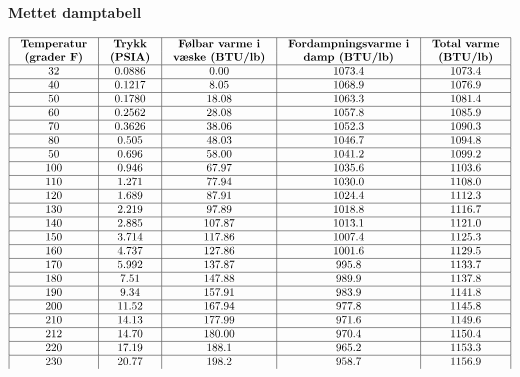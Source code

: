 


\centerline{\bf Mettet damptabell}

$$\vbox{\offinterlineskip
\halign{\strut
\vrule \quad\hfil # \ \hfil & 
\vrule \quad\hfil # \ \hfil & 
\vrule \quad\hfil # \ \hfil & 
\vrule \quad\hfil # \ \hfil & 
\vrule \quad\hfil # \ \hfil \vrule \cr
\noalign{\hrule}
%
{\bf Temperatur} & {\bf Trykk} & {\bf Følbar varme i} & {\bf Fordampningsvarme i} & {\bf Total varme} \cr
{\bf (grader F)} & {\bf (PSIA)} & {\bf væske (BTU/lb)} & {\bf damp (BTU/lb)} & {\bf (BTU/lb)} \cr
%
\noalign{\hrule}
%
32 & 0.0886 & 0.00 & 1073.4 & 1073.4 \cr
%
\noalign{\hrule}
%
40 & 0.1217 & 8.05 & 1068.9 & 1076.9 \cr
%
\noalign{\hrule}
%
50 & 0.1780 & 18.08 & 1063.3 & 1081.4 \cr
%
\noalign{\hrule}
%
60 & 0.2562 & 28.08 & 1057.8 & 1085.9 \cr
%
\noalign{\hrule}
%
70 & 0.3626 & 38.06 & 1052.3 & 1090.3 \cr
%
\noalign{\hrule}
%
80 & 0.505 & 48.03 & 1046.7 & 1094.8 \cr
%
\noalign{\hrule}
%
50 & 0.696 & 58.00 & 1041.2 & 1099.2 \cr
%
\noalign{\hrule}
%
100 & 0.946 & 67.97 & 1035.6 & 1103.6 \cr
%
\noalign{\hrule}
%
110 & 1.271 & 77.94 & 1030.0 & 1108.0 \cr
%
\noalign{\hrule}
%
120 & 1.689 & 87.91 & 1024.4 & 1112.3 \cr
%
\noalign{\hrule}
%
130 & 2.219 & 97.89 & 1018.8 & 1116.7 \cr
%
\noalign{\hrule}
%
140 & 2.885 & 107.87 & 1013.1 & 1121.0 \cr
%
\noalign{\hrule}
%
150 & 3.714 & 117.86 & 1007.4 & 1125.3 \cr
%
\noalign{\hrule}
%
160 & 4.737 & 127.86 & 1001.6 & 1129.5 \cr
%
\noalign{\hrule}
%
170 & 5.992 & 137.87 & 995.8 & 1133.7 \cr
%
\noalign{\hrule}
%
180 & 7.51 & 147.88 & 989.9 & 1137.8 \cr
%
\noalign{\hrule}
%
190 & 9.34 & 157.91 & 983.9 & 1141.8 \cr
%
\noalign{\hrule}
%
200 & 11.52 & 167.94 & 977.8 & 1145.8 \cr
%
\noalign{\hrule}
%
210 & 14.13 & 177.99 & 971.6 & 1149.6 \cr
%
\noalign{\hrule}
%
212 & 14.70 & 180.00 & 970.4 & 1150.4 \cr
%
\noalign{\hrule}
%
220 & 17.19 & 188.1 & 965.2 & 1153.3 \cr
%
\noalign{\hrule}
%
230 & 20.77 & 198.2 & 958.7 & 1156.9 \cr
}}$$

